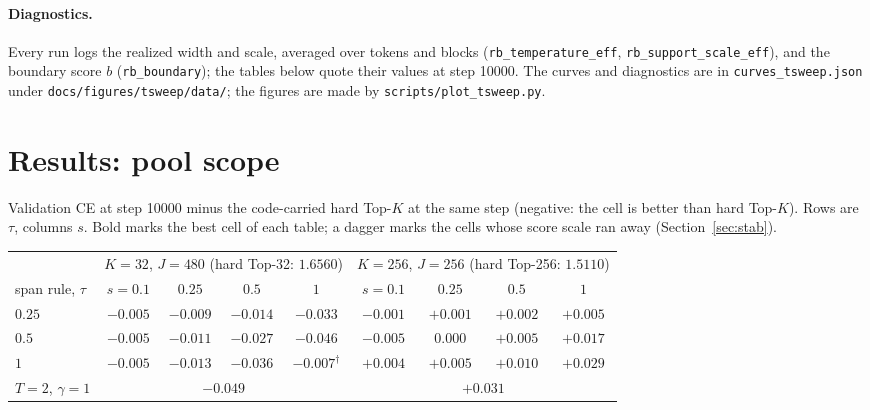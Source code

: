 \documentclass[11pt,a4paper]{article}
\newcommand{\code}[1]{\texttt{#1}}
\begin{document}
\paragraph{Diagnostics.}
Every run logs the realized width and scale, averaged over tokens and
blocks (\code{rb\_temperature\_eff}, \code{rb\_support\_scale\_eff}), and the
boundary score $b$ (\code{rb\_boundary}); the tables below quote their
values at step 10000. The curves and diagnostics are in
\code{curves\_tsweep.json} under \code{docs/figures/tsweep/data/}; the figures
are made by \code{scripts/plot\_tsweep.py}.

\section{Results: pool scope}

Validation CE at step 10000 minus the code-carried hard Top-$K$ at the same
step (negative: the cell is better than hard Top-$K$). Rows are $\tau$,
columns $s$. Bold marks the best cell of each table; a dagger marks the
cells whose score scale ran away (Section~\ref{sec:stab}).

\begin{center}\small
\begin{tabular}{l|cccc|cccc}
\toprule
& \multicolumn{4}{c|}{$K = 32$, $J = 480$ (hard Top-32: $1.6560$)}
& \multicolumn{4}{c}{$K = 256$, $J = 256$ (hard Top-256: $1.5110$)} \\
span rule, $\tau$ & $s{=}0.1$ & $0.25$ & $0.5$ & $1$ & $s{=}0.1$ & $0.25$ & $0.5$ & $1$ \\
\midrule
$0.25$ & $-0.005$ & $-0.009$ & $-0.014$ & $-0.033$ & $-0.001$ & $+0.001$ & $+0.002$ & $+0.005$ \\
$0.5$  & $-0.005$ & $-0.011$ & $-0.027$ & $\mathbf{-0.046}$ & $\mathbf{-0.005}$ & $0.000$ & $+0.005$ & $+0.017$ \\
$1$    & $-0.005$ & $-0.013$ & $-0.036$ & $-0.007^\dagger$ & $+0.004$ & $+0.005$ & $+0.010$ & $+0.029$ \\
\midrule
$T{=}2$, $\gamma{=}1$ & \multicolumn{4}{c|}{$-0.049$} & \multicolumn{4}{c}{$+0.031$} \\
\bottomrule
\end{tabular}
\end{center}
\end{document}
